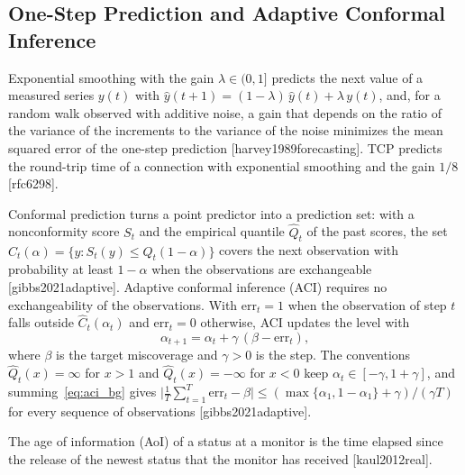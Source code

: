 \subsection{One-Step Prediction and Adaptive Conformal Inference}\label{subsec:aci}
Exponential smoothing with the gain $\lambda \in (0, 1]$ predicts the next value of a measured series $y(t)$ with $\hat{y}(t+1) = (1 - \lambda)\,\hat{y}(t) + \lambda\, y(t)$, and, for a random walk observed with additive noise, a gain that depends on the ratio of the variance of the increments to the variance of the noise minimizes the mean squared error of the one-step prediction [harvey1989forecasting]. TCP predicts the round-trip time of a connection with exponential smoothing and the gain $1/8$ [rfc6298].

Conformal prediction turns a point predictor into a prediction set: with a nonconformity score $S_t$ and the empirical quantile $\hat{Q}_t$ of the past scores, the set $\hat{C}_t(\alpha) = \{y : S_t(y) \leq \hat{Q}_t(1 - \alpha)\}$ covers the next observation with probability at least $1 - \alpha$ when the observations are exchangeable [gibbs2021adaptive]. Adaptive conformal inference (ACI) requires no exchangeability of the observations. With $\mathrm{err}_t = 1$ when the observation of step $t$ falls outside $\hat{C}_t(\alpha_t)$ and $\mathrm{err}_t = 0$ otherwise, ACI updates the level with
\begin{equation}
\alpha_{t+1} = \alpha_t + \gamma\,(\beta - \mathrm{err}_t),
\label{eq:aci_bg}
\end{equation}
where $\beta$ is the target miscoverage and $\gamma > 0$ is the step. The conventions $\hat{Q}_t(x) = \infty$ for $x > 1$ and $\hat{Q}_t(x) = -\infty$ for $x < 0$ keep $\alpha_t \in [-\gamma, 1 + \gamma]$, and summing~\eqref{eq:aci_bg} gives $\big|\frac{1}{T}\sum_{t=1}^{T} \mathrm{err}_t - \beta\big| \leq (\max\{\alpha_1, 1 - \alpha_1\} + \gamma)/(\gamma T)$ for every sequence of observations [gibbs2021adaptive].

The age of information (AoI) of a status at a monitor is the time elapsed since the release of the newest status that the monitor has received [kaul2012real].

